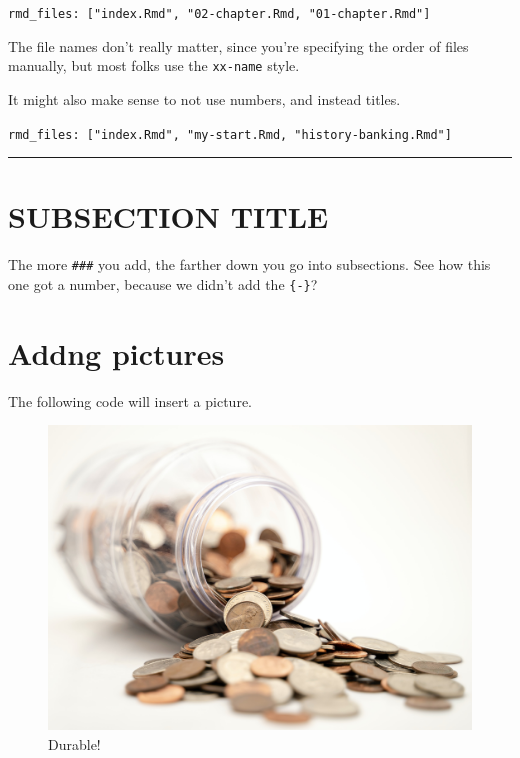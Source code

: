 \documentclass[
]{book}
\begin{document}
\texttt{rmd\_files:\ {[}"index.Rmd",\ "02-chapter.Rmd,\ "01-chapter.Rmd"{]}}

The file names don't really matter,
since you're specifying the order of files manually,
but most folks use the \texttt{xx-name} style.

It might also make sense to not use numbers, and instead titles.

\texttt{rmd\_files:\ {[}"index.Rmd",\ "my-start.Rmd,\ "history-banking.Rmd"{]}}

\begin{center}\rule{0.5\linewidth}{0.5pt}\end{center}

\hypertarget{subsection-title-1}{%
\section{SUBSECTION TITLE}\label{subsection-title-1}}

The more \texttt{\#\#\#} you add, the farther down you go into subsections.
See how this one got a number, because we didn't add the \texttt{\{-\}}?

\hypertarget{addng-pictures}{%
\section*{Addng pictures}\label{addng-pictures}}


The following code will insert a picture.

\begin{figure}
\centering
\includegraphics{images/coins.jpg}
\caption{\label{fig:example-coins}Durable!}
\end{figure}
\end{document}
